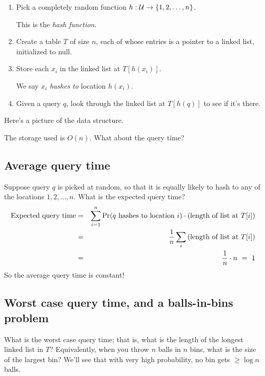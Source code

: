 \begin{enumerate}
\item Pick a completely random function $h: {\cal U} \rightarrow \{1,2,\ldots, n\}$. 

This is the {\it hash function}. 

\item Create a table $T$ of size $n$, each of whose entries is a pointer to a 
linked list, initialized to null. 

\item Store each $x_i$ in the linked list at $T[h(x_i)]$.

We say $x_i$ {\it hashes to} location $h(x_i)$.

\item Given a query $q$, look through the linked list at $T[h(q)]$ to see if
it's there.
\end{enumerate}

Here's a picture of the data structure.

\begin{center}
\end{center}

The storage used is $O(n)$. What about the query time?

\subsection{Average query time}

Suppose query $q$ is picked at random, so that it is equally likely to hash to
any of the locations $1,2,\ldots, n$. What is the expected query time?
\begin{eqnarray*}
\mbox{Expected query time}
& =& 
\sum_{i=1}^n \mbox{\rm Pr}(\mbox{$q$ hashes to location $i$}) \cdot \mbox{(length of list at $T[i]$)} \\
& =&
\frac{1}{n} \sum_i  \mbox{(length of list at $T[i]$)} \\ 
& = & 
\frac{1}{n} \cdot n \ = \ 1
\end{eqnarray*}
So the average query time is constant!

\subsection{Worst case query time, and a balls-in-bins problem}

What is the worst case query time; that is, what is the length of the
longest linked list in $T$? Equivalently, when you throw $n$ balls in
$n$ bins, what is the size of the largest bin? We'll see that with
very high probability, no bin gets $\geq \log n$ balls.

